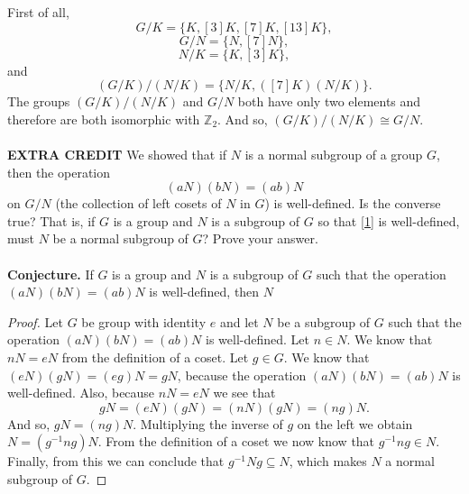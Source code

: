 \documentclass[11pt]{article}
\begin{document}
First of all,
\[ G/K = \{K, [3]K, [7]K, [13]K\},\]
\[ G/N = \{N, [7]N\}, \]
\[ N/K = \{K, [3]K\},\]
and
\[(G/K)/(N/K) = \{ N/K, ([7]K)(N/K) \}.\]
The groups $(G/K)/(N/K)$ and $G/N$ both have only two elements and therefore are both isomorphic with $\mathbb{Z}_2$. And so, $(G/K)/(N/K) \cong G/N$.\\
~\\
{\bf EXTRA CREDIT} We showed that if $N$ is a normal subgroup of a group $G$, then the operation
\begin{equation}\label{1}
(aN)(bN) = (ab)N
\end{equation}
on $G/N$ (the collection of left cosets of $N$ in $G$) is well-defined. Is the converse true? That is, if $G$ is a group and $N$ is a subgroup of $G$ so that \eqref{1} is well-defined, must $N$ be a normal subgroup of $G$? Prove your answer.\\
~\\
{\bf Conjecture.} If $G$ is a group and $N$ is a subgroup of $G$ such that the operation $(aN)(bN) = (ab)N$ is well-defined, then $N$
\begin{proof}
Let $G$ be group with identity $e$ and let $N$ be a subgroup of $G$ such that the operation $(aN)(bN) = (ab)N$ is well-defined. Let $n\in N$. We know that $nN = eN$ from the definition of a coset. Let $g\in G$. We know that $(eN)(gN) = (eg)N = gN$, because the operation $(aN)(bN) = (ab)N$ is well-defined. Also, because $nN = eN$ we see that 
\[gN = (eN)(gN) = (nN)(gN) = (ng)N.\]
And so, $gN = (ng)N$. Multiplying the inverse of $g$ on the left we obtain $N = (g^{-1}ng)N$. From the definition of a coset we now know that $g^{-1}ng \in N$. Finally, from this we can conclude that $g^{-1}Ng \subseteq N$, which makes $N$ a normal subgroup of $G$.
\end{proof}
\end{document}
